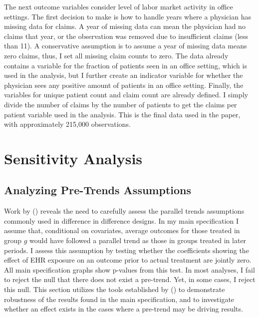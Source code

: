\documentclass[12pt]{article}
\begin{document}
The next outcome variables consider level of labor market activity in office settings. The first decision to make is how to handle years where a physician has missing data for claims. A year of missing data can mean the physician had no claims that year, or the observation was removed due to insufficient claims (less than 11). A conservative assumption is to assume a year of missing data means zero claims, thus, I set all missing claim counts to zero. The data already contains a variable for the fraction of patients seen in an office setting, which is used in the analysis, but I further create an indicator variable for whether the physician sees any positive amount of patients in an office setting. Finally, the variables for unique patient count and claim count are already defined. I simply divide the number of claims by the number of patients to get the claims per patient variable used in the analysis. This is the final data used in the paper, with approximately 215,000 observations. 



\section{Sensitivity Analysis}

\subsection{Analyzing Pre-Trends Assumptions}\label{sec:pretrends}

Work by \citeauthor{rambachan2019honest} (\citeyear{rambachan2019honest}) reveals the need to carefully assess the parallel trends assumptions commonly used in difference in difference designs. In my main specification I assume that, conditional on covariates, average outcomes for those treated in group $g$ would have followed a parallel trend as those in groups treated in later periods. I assess this assumption by testing whether the coefficients showing the effect of EHR exposure on an outcome prior to actual treatment are jointly zero. All main specification graphs show p-values from this test. In most analyses, I fail to reject the null that there does not exist a pre-trend. Yet, in some cases, I reject this null. This section utilizes the tools established by \citeauthor{rambachan2019honest} (\citeyear{rambachan2019honest}) to demonstrate robustness of the results found in the main specification, and to investigate whether an effect exists in the cases where a pre-trend may be driving results. 
\end{document}
